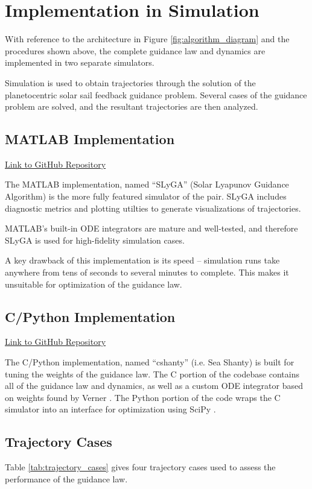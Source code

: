 \section{Implementation in Simulation}
With reference to the architecture in Figure \ref{fig:algorithm_diagram} and the procedures shown above, the complete guidance law and dynamics are implemented in two separate simulators.

Simulation is used to obtain trajectories through the solution of the planetocentric solar sail feedback guidance problem. Several cases of the guidance problem are solved, and the resultant trajectories are then analyzed.

\subsection{MATLAB Implementation}
\href{https://github.com/itchono/SLyGA}{Link to GitHub Repository}

The MATLAB implementation, named ``SLyGA'' (Solar Lyapunov Guidance Algorithm) is the more fully featured simulator of the pair. SLyGA includes diagnostic metrics and plotting utilties to generate visualizations of trajectories.

MATLAB's built-in ODE integrators are mature and well-tested, and therefore SLyGA is used for high-fidelity simulation cases. 

A key drawback of this implementation is its speed -- simulation runs take anywhere from tens of seconds to several minutes to complete. This makes it unsuitable for optimization of the guidance law.

\subsection{C/Python Implementation}
\href{https://github.com/itchono/cshanty}{Link to GitHub Repository}

The C/Python implementation, named ``cshanty'' (i.e. Sea Shanty) is built for tuning the weights of the guidance law. The C portion of the codebase contains all of the guidance law and dynamics, as well as a custom ODE integrator based on weights found by Verner \cite{verner2010numerically}. The Python portion of the code wraps the C simulator into an interface for optimization using SciPy \cite{2020SciPy-NMeth}.

\subsection{Trajectory Cases}
Table \ref{tab:trajectory_cases} gives four trajectory cases used to assess the performance of the guidance law.

